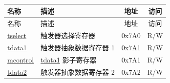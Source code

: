 \begin{longtable}{ | p{4.0cm} | p{8.4cm} | c | c| }
\hline\rowcolor{lightgray}
名称 & 描述 & 地址 & 访问 \\ \hline
\endfirsthead
\hline
\rowcolor{lightgray}
名称 & 描述 & 地址 & 访问 \\ \hline
\endhead
\endfoot

\hyperref[regdesc:LPTSELECT]{tselect} & 触发器选择寄存器 & 0x7A0 & R/W \\\hline
\hyperref[regdesc:LPTDATA1]{tdata1} & 触发器抽象数据寄存器 1 & 0x7A1 & R/W \\\hline
\hyperref[regdesc:LPMCONTROL]{mcontrol} & \hyperref[regdesc:LPTDATA1]{tdata1} 影子寄存器  & 0x7A1 & R/W \\\hline
\hyperref[regdesc:LPTDATA2]{tdata2} & 触发器抽象数据寄存器 2 & 0x7A2 & R/W \\\hline
\end{longtable}
